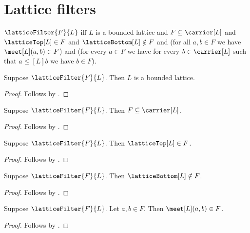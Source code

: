 \section{Lattice filters}




\begin{definition}\label{lattice_filter}
    $\latticeFilter{F}{L}$ iff
        $L$ is a bounded lattice and
        $F\subseteq\carrier[L]$ and
        $\latticeTop[L]\in F$ and
        $\latticeBottom[L]\notin F$ and
        (for all $a,b\in F$ we have $\meet[L](a,b)\in F$) and
        (for every $a\in F$ we have
            for every $b\in\carrier[L]$ such that
                $a\mathrel{\leq[L]}b$ we have $b\in F$).
\end{definition}

\begin{proposition}\label{lattice_filter_ambient}
    Suppose $\latticeFilter{F}{L}$.
    Then $L$ is a bounded lattice.
\end{proposition}
\begin{proof}
    Follows by .
\end{proof}

\begin{proposition}\label{lattice_filter_subseteq_carrier}
    Suppose $\latticeFilter{F}{L}$.
    Then $F\subseteq\carrier[L]$.
\end{proposition}
\begin{proof}
    Follows by .
\end{proof}

\begin{proposition}\label{lattice_filter_top}
    Suppose $\latticeFilter{F}{L}$.
    Then $\latticeTop[L]\in F$.
\end{proposition}
\begin{proof}
    Follows by .
\end{proof}

\begin{proposition}\label{lattice_filter_bottom_notin}
    Suppose $\latticeFilter{F}{L}$.
    Then $\latticeBottom[L]\notin F$.
\end{proposition}
\begin{proof}
    Follows by .
\end{proof}

\begin{proposition}\label{lattice_filter_meet}
    Suppose $\latticeFilter{F}{L}$.
    Let $a,b\in F$.
    Then $\meet[L](a,b)\in F$.
\end{proposition}
\begin{proof}
    Follows by .
\end{proof}


